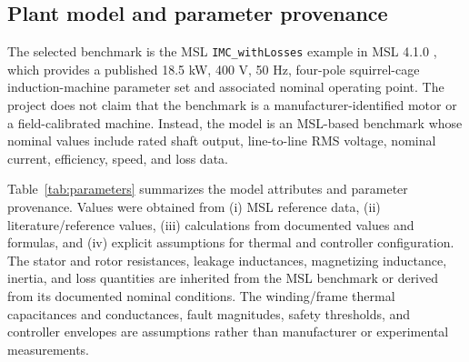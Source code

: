\documentclass[machines,article,submit,moreauthors]{Definitions/mdpi}
\begin{document}
\subsection{Plant model and parameter provenance}

The selected benchmark is the MSL \texttt{IMC\_withLosses} example in MSL 4.1.0 \cite{msl2024}, which provides a published 18.5 kW, 400 V, 50 Hz, four-pole squirrel-cage induction-machine parameter set and associated nominal operating point. The project does not claim that the benchmark is a manufacturer-identified motor or a field-calibrated machine. Instead, the model is an MSL-based benchmark whose nominal values include rated shaft output, line-to-line RMS voltage, nominal current, efficiency, speed, and loss data.

Table~\ref{tab:parameters} summarizes the model attributes and parameter provenance. Values were obtained from (i) MSL reference data, (ii) literature/reference values, (iii) calculations from documented values and formulas, and (iv) explicit assumptions for thermal and controller configuration. The stator and rotor resistances, leakage inductances, magnetizing inductance, inertia, and loss quantities are inherited from the MSL benchmark or derived from its documented nominal conditions. The winding/frame thermal capacitances and conductances, fault magnitudes, safety thresholds, and controller envelopes are assumptions rather than manufacturer or experimental measurements.
\end{document}
